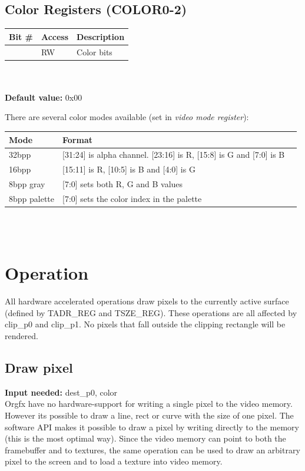 \documentclass[10pt,a4paper]{article}
\begin{document}
\subsection{Color Registers (COLOR0-2)}
\begin{tabular}{|l|l|l|}
\hline \textbf{Bit \#} & \textbf{Access} & \textbf{Description} \\ 
\hline
\hline [31:0] & RW & Color bits \\
\hline 
\end{tabular}
\\\\
\textbf{Default value:} 0x00

There are several color modes available (set in \textit{video mode register}):

\begin{tabular}{|l|l|l|}
\hline \textbf{Mode} & \textbf{Format} \\ 
\hline
\hline 32bpp & [31:24] is alpha channel. [23:16] is R, [15:8] is G and [7:0] is B \\
\hline 16bpp & [15:11] is R, [10:5] is B and [4:0] is G\\
\hline 8bpp gray & [7:0] sets both R, G and B values \\
\hline 8bpp palette & [7:0] sets the color index in the palette \\
\hline 
\end{tabular}
\\\\

\section{Operation}
All hardware accelerated operations draw pixels to the currently active surface (defined by TADR\_REG and TSZE\_REG). These operations are all affected by clip\_p0 and clip\_p1. No pixels that fall outside the clipping rectangle will be rendered.

\subsection{Draw pixel}
\textbf{Input needed:} dest\_p0, color\\
Orgfx have no hardware-support for writing a single pixel to the video memory. However its possible to draw a line, rect or curve with the size of one pixel. The software API makes it possible to draw a pixel by writing directly to the memory (this is the most optimal way). Since the video memory can point to both the framebuffer and to textures, the same operation can be used to draw an arbitrary pixel to the screen and to load a texture into video memory.
\end{document}

